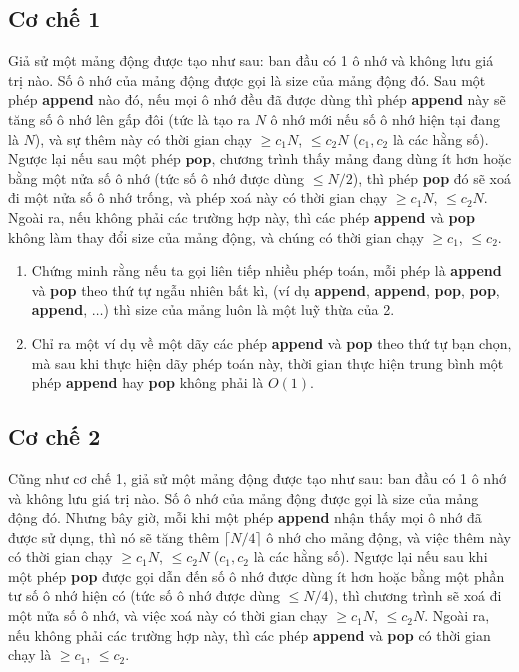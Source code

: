 \documentclass{article}
\begin{document}
\subsection{Cơ chế 1}
Giả sử một mảng động được tạo như sau: ban đầu có 1 ô nhớ và không lưu giá trị nào. Số ô nhớ của mảng động được gọi là size của mảng động đó. Sau một phép \textbf{append} nào đó, nếu mọi ô nhớ đều đã được dùng thì phép \textbf{append} này sẽ tăng số ô nhớ lên gấp đôi (tức là tạo ra $N$ ô nhớ mới nếu số ô nhớ hiện tại đang là $N$), và sự thêm này có thời gian chạy $\geq c_1 N$, $\leq c_2 N$ ($c_1, c_2$ là các hằng số). Ngược lại nếu sau một phép $\textbf{pop}$, chương trình thấy mảng đang dùng ít hơn hoặc bằng một nửa số ô nhớ (tức số ô nhớ được dùng $\leq N/2$), thì phép \textbf{pop} đó sẽ xoá đi một nửa số ô nhớ trống, và phép xoá này có thời gian chạy $\geq c_1 N$, $\leq c_2 N$. Ngoài ra, nếu không phải các trường hợp này, thì các phép \textbf{append} và \textbf{pop} không làm thay đổi size của mảng động, và chúng có thời gian chạy $\geq c_1$, $\leq c_2$. 
\begin{em}
    \begin{enumerate}
        \item Chứng minh rằng nếu ta gọi liên tiếp nhiều phép toán, mỗi phép là \textbf{append} và \textbf{pop} theo thứ tự ngẫu nhiên bất kì, (ví dụ \textbf{append}, \textbf{append}, \textbf{pop}, \textbf{pop}, \textbf{append}, $\ldots$) thì size của mảng luôn là một luỹ thừa của 2.
        
        \item Chỉ ra một ví dụ về một dãy các phép \textbf{append} và \textbf{pop} theo thứ tự bạn chọn, mà sau khi thực hiện dãy phép toán này, thời gian thực hiện trung bình một phép \textbf{append} hay \textbf{pop} không phải là $O(1)$.
    \end{enumerate}
\end{em}

\subsection{Cơ chế 2}
Cũng như cơ chế 1, giả sử một mảng động được tạo như sau: ban đầu có 1 ô nhớ và không lưu giá trị nào. Số ô nhớ của mảng động được gọi là size của mảng động đó. Nhưng bây giờ, mỗi khi một phép \textbf{append} nhận thấy mọi ô nhớ đã được sử dụng, thì nó sẽ tăng thêm $\lceil N/4 \rceil$ ô nhớ cho mảng động, và việc thêm này có thời gian chạy $\geq c_1 N$, $\leq c_2 N$ ($c_1, c_2$ là các hằng số). Ngược lại nếu sau khi một phép \textbf{pop} được gọi dẫn đến số ô nhớ được dùng ít hơn hoặc bằng một phần tư số ô nhớ hiện có (tức số ô nhớ được dùng $\leq N/4$), thì chương trình sẽ xoá đi một nửa số ô nhớ, và việc xoá này có thời gian chạy $\geq c_1 N$, $\leq c_2 N$. Ngoài ra, nếu không phải các trường hợp này, thì các phép \textbf{append} và \textbf{pop} có thời gian chạy là  $\geq c_1$, $\leq c_2$. \\
\end{document}
